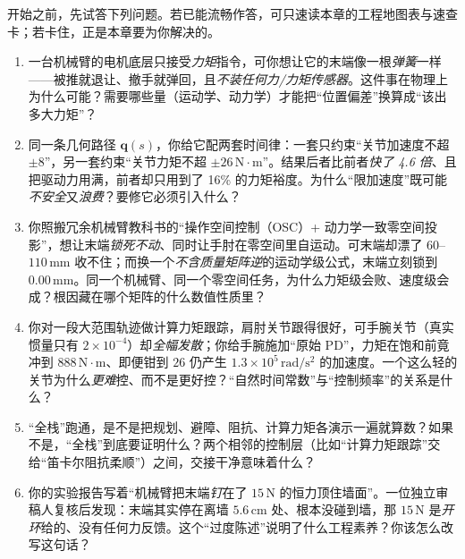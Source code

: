 \begin{practice}[前置自测]
开始之前，先试答下列问题。若已能流畅作答，可只速读本章的工程地图表与速查卡；若卡住，正是本章要为你解决的。
\begin{enumerate}
  \item 一台机械臂的电机底层只接受\emph{力矩}指令，可你想让它的末端像一根\emph{弹簧}一样——被推就退让、撤手就弹回，且\emph{不装任何力/力矩传感器}。这件事在物理上为什么可能？需要哪些量（运动学、动力学）才能把“位置偏差”换算成“该出多大力矩”？
  \item 同一条几何路径 $\mathbf{q}(s)$，你给它配两套时间律：一套只约束“关节加速度不超 $\pm 8$”，另一套约束“关节力矩不超 $\pm 26\,\mathrm{N\!\cdot\! m}$”。结果后者比前者\emph{快了 4.6 倍}、且把驱动力用满，前者却只用到了 16\% 的力矩裕度。为什么“限加速度”既可能\emph{不安全}又\emph{浪费}？要修它必须引入什么？
  \item 你照搬冗余机械臂教科书的“操作空间控制（OSC）+ 动力学一致零空间投影”，想让末端\emph{锁死不动}、同时让手肘在零空间里自运动。可末端却漂了 $60$--$110\,\mathrm{mm}$ 收不住；而换一个\emph{不含质量矩阵逆}的运动学级公式，末端立刻锁到 $0.00\,\mathrm{mm}$。同一个机械臂、同一个零空间任务，为什么力矩级会败、速度级会成？根因藏在哪个矩阵的什么数值性质里？
  \item 你对一段大范围轨迹做计算力矩跟踪，肩肘关节跟得很好，可手腕关节（真实惯量只有 $2\times10^{-4}$）却\emph{全幅发散}；你给手腕施加“原始 PD”，力矩在饱和前竟冲到 $888\,\mathrm{N\!\cdot\! m}$、即便钳到 $26$ 仍产生 $1.3\times 10^{5}\,\mathrm{rad/s^2}$ 的加速度。一个这么轻的关节为什么\emph{更难}控、而不是更好控？“自然时间常数”与“控制频率”的关系是什么？
  \item “全栈”跑通，是不是把规划、避障、阻抗、计算力矩各演示一遍就算数？如果不是，“全栈”到底要证明什么？两个相邻的控制层（比如“计算力矩跟踪”交给“笛卡尔阻抗柔顺”）之间，交接干净意味着什么？
  \item 你的实验报告写着“机械臂把末端\emph{钉}在了 $15\,\mathrm{N}$ 的恒力顶住墙面”。一位独立审稿人复核后发现：末端其实停在离墙 $5.6\,\mathrm{cm}$ 处、根本没碰到墙，那 $15\,\mathrm{N}$ 是\emph{开环}给的、没有任何力反馈。这个“过度陈述”说明了什么工程素养？你该怎么改写这句话？
\end{enumerate}
\end{practice}

